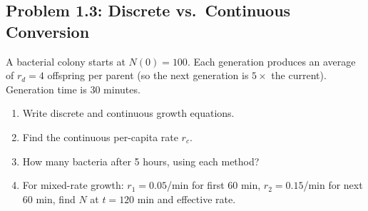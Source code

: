 \documentclass[10pt]{article}
\begin{document}
\subsection{Problem 1.3: Discrete vs.\ Continuous Conversion}

\begin{problem}
A bacterial colony starts at $N(0) = 100$. Each generation produces an average of $r_d = 4$ offspring per parent (so the next generation is $5\times$ the current). Generation time is 30 minutes.

\begin{enumerate}[label=(\alph*)]
\item Write discrete and continuous growth equations.
\item Find the continuous per-capita rate $r_c$.
\item How many bacteria after 5 hours, using each method?
\item For mixed-rate growth: $r_1 = 0.05$/min for first 60 min, $r_2 = 0.15$/min for next 60 min, find $N$ at $t = 120$ min and effective rate.
\end{enumerate}
\end{problem}
\end{document}
